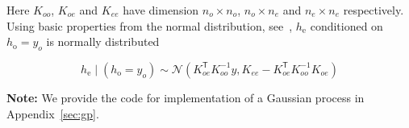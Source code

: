 \documentclass[a4paper,10pt]{article}
\newcommand{\trnsp}{\mathsf{T}}
\newcommand{\N}{\mathcal{N}}
\newenvironment{note}
{
\begin{center}
\begin{lrbox}{\mybox}
\begin{minipage}{42em}}
{\end{minipage}
\end{lrbox}\fbox{\usebox{\mybox}}
\end{center}}
\begin{document}
Here $K_{oo}$, $K_{oe}$ and $K_{ee}$ have dimension $n_o \times n_o$, $n_o \times n_e$ and  $n_e \times n_e$ respectively.
Using basic properties from the normal distribution, see~\citep[Section 9.A, Theorem 9.3]{lindholm_machine_2022},  $h_{\text{e}}$ conditioned on $h_{\text{o}} = y_o$ is normally distributed

\begin{equation}
    h_{\text{e}}\mid (h_{\text{o}} = y_o)
    \sim
    \N \left(
    K_{oe}^\trnsp K_{oo}^{-1} y,
    K_{ee} - K_{oe}^\trnsp K_{oo}^{-1} K_{oe}
    \right)
\end{equation}
\begin{note}
    \textbf{Note:} We provide the code for implementation of a Gaussian process in Appendix~\ref{sec:gp}.
\end{note}
\end{document}
